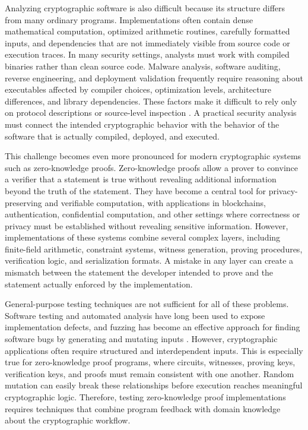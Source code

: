 Analyzing cryptographic software is also difficult because its structure differs from many ordinary programs. Implementations often contain dense mathematical computation, optimized arithmetic routines, carefully formatted inputs, and dependencies that are not immediately visible from source code or execution traces. In many security settings, analysts must work with compiled binaries rather than clean source code. Malware analysis, software auditing, reverse engineering, and deployment validation frequently require reasoning about executables affected by compiler choices, optimization levels, architecture differences, and library dependencies. These factors make it difficult to rely only on protocol descriptions or source-level inspection \cite{shoshitaishvili2016sok}. A practical security analysis must connect the intended cryptographic behavior with the behavior of the software that is actually compiled, deployed, and executed.

This challenge becomes even more pronounced for modern cryptographic systems such as zero-knowledge proofs. Zero-knowledge proofs allow a prover to convince a verifier that a statement is true without revealing additional information beyond the truth of the statement. They have become a central tool for privacy-preserving and verifiable computation, with applications in blockchains, authentication, confidential computation, and other settings where correctness or privacy must be established without revealing sensitive information. However, implementations of these systems combine several complex layers, including finite-field arithmetic, constraint systems, witness generation, proving procedures, verification logic, and serialization formats. A mistake in any layer can create a mismatch between the statement the developer intended to prove and the statement actually enforced by the implementation.

General-purpose testing techniques are not sufficient for all of these problems. Software testing and automated analysis have long been used to expose implementation defects, and fuzzing has become an effective approach for finding software bugs by generating and mutating inputs \cite{manes2019art}. However, cryptographic applications often require structured and interdependent inputs. This is especially true for zero-knowledge proof programs, where circuits, witnesses, proving keys, verification keys, and proofs must remain consistent with one another. Random mutation can easily break these relationships before execution reaches meaningful cryptographic logic. Therefore, testing zero-knowledge proof implementations requires techniques that combine program feedback with domain knowledge about the cryptographic workflow.

